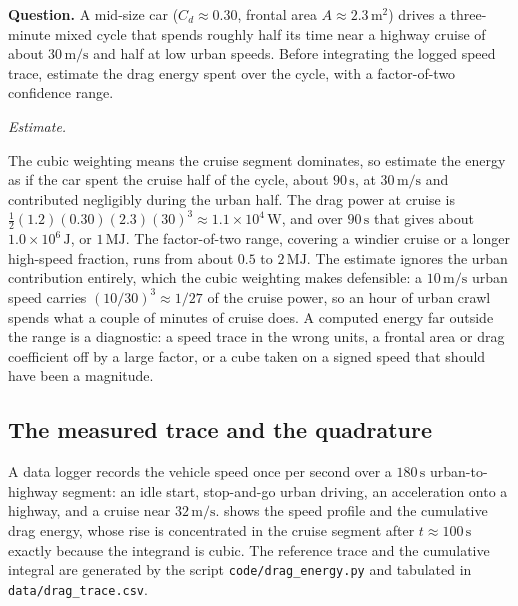 \begin{estimation}
\textbf{Question.} A mid-size car ($C_{d} \approx 0.30$, frontal area
$A \approx 2.3\,\si{\meter\squared}$) drives a three-minute mixed cycle
that spends roughly half its time near a highway cruise of about
$30\,\si{\meter\per\second}$ and half at low urban speeds. Before
integrating the logged speed trace, estimate the drag energy spent over
the cycle, with a factor-of-two confidence range.

\smallskip
\textit{Estimate.}

\smallskip
The cubic weighting means the cruise segment dominates, so estimate the
energy as if the car spent the cruise half of the cycle, about
$90\,\si{\second}$, at $30\,\si{\meter\per\second}$ and contributed
negligibly during the urban half. The drag power at cruise is
$\tfrac{1}{2}(1.2)(0.30)(2.3)(30)^{3} \approx 1.1\times
10^{4}\,\si{\watt}$, and over $90\,\si{\second}$ that gives about
$1.0\times 10^{6}\,\si{\joule}$, or $1\,\si{\mega\joule}$. The
factor-of-two range, covering a windier cruise or a longer high-speed
fraction, runs from about $0.5$ to $2\,\si{\mega\joule}$. The estimate
ignores the urban contribution entirely, which the cubic weighting
makes defensible: a $10\,\si{\meter\per\second}$ urban speed carries
$(10/30)^{3} \approx 1/27$ of the cruise power, so an hour of urban
crawl spends what a couple of minutes of cruise does. A computed
energy far outside the range is a diagnostic: a speed trace in the
wrong units, a frontal area or drag coefficient off by a large factor,
or a cube taken on a signed speed that should have been a magnitude.
\end{estimation}

\subsection{The measured trace and the quadrature}

A data logger records the vehicle speed once per second over a
$180\,\si{\second}$ urban-to-highway segment: an idle start, stop-and-go
urban driving, an acceleration onto a highway, and a cruise near
$32\,\si{\meter\per\second}$.
 shows the speed profile and the
cumulative drag energy, whose rise is concentrated in the cruise
segment after $t \approx 100\,\si{\second}$ exactly because the
integrand is cubic. The reference trace and the cumulative integral are
generated by the script \texttt{code/drag\_energy.py} and tabulated in
\texttt{data/drag\_trace.csv}.

